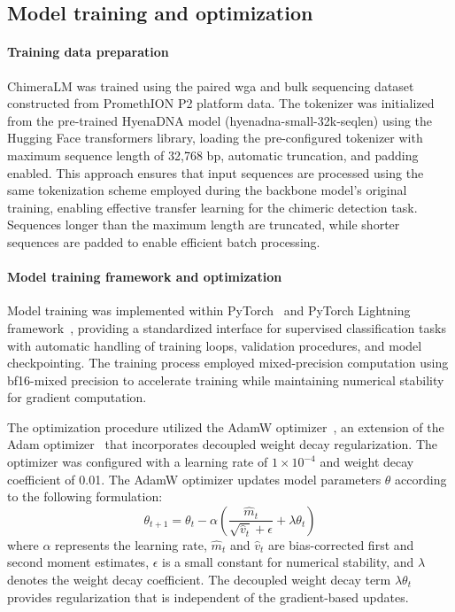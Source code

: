 \documentclass[pdflatex,sn-nature]{sn-jnl}%
\theoremstyle{thmstyleone}%
\theoremstyle{thmstyletwo}%
\theoremstyle{thmstylethree}%
\begin{document}
\subsection*{Model training and optimization}

\paragraph{Training data preparation}
ChimeraLM was trained using the paired \gls{wga} and bulk sequencing dataset constructed from PromethION P2 platform data.
The tokenizer was initialized from the pre-trained HyenaDNA model (hyenadna-small-32k-seqlen) using the Hugging Face transformers library, loading the pre-configured tokenizer with maximum sequence length of 32,768 bp, automatic truncation, and padding enabled.
This approach ensures that input sequences are processed using the same tokenization scheme employed during the backbone model's original training, enabling effective transfer learning for the chimeric detection task.
Sequences longer than the maximum length are truncated, while shorter sequences are padded to enable efficient batch processing.

\paragraph{Model training framework and optimization}
Model training was implemented within PyTorch~\cite{paszke2019pytorch} and PyTorch Lightning framework~\cite{Falcon_PyTorch_Lightning_2019}, providing a standardized interface for supervised classification tasks with automatic handling of training loops, validation procedures, and model checkpointing.
The training process employed mixed-precision computation using bf16-mixed precision to accelerate training while maintaining numerical stability for gradient computation.

The optimization procedure utilized the AdamW optimizer~\cite{adamw}, an extension of the Adam optimizer~\cite{kingma2014adam} that incorporates decoupled weight decay regularization.
The optimizer was configured with a learning rate of $1\times10^{-4}$ and weight decay coefficient of 0.01.
The AdamW optimizer updates model parameters $\theta$ according to the following formulation:
$$
	\theta_{t+1} = \theta_t - \alpha \left( \frac{\hat{m}_t}{\sqrt{\hat{v}_t} + \epsilon} + \lambda \theta_t \right)
$$
where $\alpha$ represents the learning rate, $\hat{m}_t$ and $\hat{v}_t$ are bias-corrected first and second moment estimates, $\epsilon$ is a small constant for numerical stability, and $\lambda$ denotes the weight decay coefficient.
The decoupled weight decay term $\lambda \theta_t$ provides regularization that is independent of the gradient-based updates.
\end{document}
